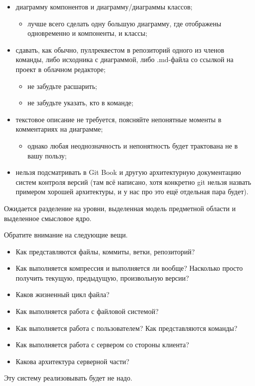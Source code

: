 \documentclass[a5paper]{article}
\begin{document}
\begin{itemize}
    \item диаграмму компонентов и диаграмму/диаграммы классов;
    \begin{itemize}
        \item лучше всего сделать одну большую диаграмму, где отображены одновременно и компоненты, и классы;
    \end{itemize}
    \item сдавать, как обычно, пуллреквестом в репозиторий одного из членов команды, либо исходника с диаграммой, либо .md-файла со ссылкой на проект в облачном редакторе;
    \begin{itemize}
        \item не забудьте расшарить;
        \item не забудьте указать, кто в команде;
    \end{itemize}
    \item текстовое описание не требуется, поясняйте непонятные моменты в комментариях на диаграмме;
    \begin{itemize}
        \item однако любая неоднозначность и непонятность будет трактована не в вашу пользу;
    \end{itemize}
    \item нельзя подсматривать в Git Book и другую архитектурную документацию систем контроля версий (там всё написано, хотя конкретно git нельзя назвать примером хорошей архитектуры, и у нас про это ещё отдельная пара будет).
\end{itemize}

Ожидается разделение на уровни, выделенная модель предметной области и выделенное смысловое ядро.

Обратите внимание на следующие вещи.

\begin{itemize}
    \item Как представляются файлы, коммиты, ветки, репозиторий?
    \item Как выполняется компрессия и выполняется ли вообще? Насколько просто получить текущую, предыдущую, произвольную версии?
    \item Каков жизненный цикл файла?
    \item Как выполняется работа с файловой системой?
    \item Как выполняется работа с пользователем? Как представляются команды?
    \item Как выполняется работа с сервером со стороны клиента?
    \item Какова архитектура серверной части?
\end{itemize}

Эту систему реализовывать будет не надо.
\end{document}
